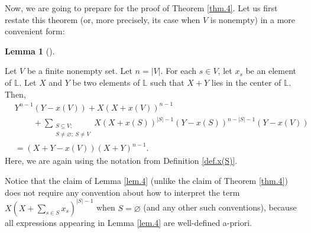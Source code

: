 \documentclass[numbers=enddot,12pt,final,onecolumn,notitlepage]{scrartcl}%
\theoremstyle{definition}
\newtheorem{lem}[theo]{Lemma}
\newenvironment{lemma}[1][]
{\begin{lem}[#1]\begin{leftbar}}
{\end{leftbar}\end{lem}}
\let\sumnonlimits\sum
\renewcommand{\sum}{\sumnonlimits\limits}
\newenvironment{verlong}{}{}
\begin{document}
\begin{verlong}
Now, we are going to prepare for the proof of Theorem \ref{thm.4}. Let us
first restate this theorem (or, more precisely, its case when $V$ is nonempty)
in a more convenient form:

\begin{lemma}
\label{lem.4}Let $V$ be a finite nonempty set. Let $n=\left\vert V\right\vert
$. For each $s\in V$, let $x_{s}$ be an element of $\mathbb{L}$. Let $X$ and
$Y$ be two elements of $\mathbb{L}$ such that $X+Y$ lies in the center of
$\mathbb{L}$. Then,%
\begin{align*}
&  Y^{n-1}\left(  Y-x\left(  V\right)  \right)  +X\left(  X+x\left(  V\right)
\right)  ^{n-1}\\
&  \ \ \ \ \ \ \ \ \ \ +\sum_{\substack{S\subseteq V;\\S\neq\varnothing
;\ S\neq V}}X\left(  X+x\left(  S\right)  \right)  ^{\left\vert S\right\vert
-1}\left(  Y-x\left(  S\right)  \right)  ^{n-\left\vert S\right\vert
-1}\left(  Y-x\left(  V\right)  \right) \\
&  =\left(  X+Y-x\left(  V\right)  \right)  \left(  X+Y\right)  ^{n-1}.
\end{align*}
Here, we are again using the notation from Definition \ref{def.x(S)}.
\end{lemma}

Notice that the claim of Lemma \ref{lem.4} (unlike the claim of Theorem
\ref{thm.4}) does not require any convention about how to interpret the term
$X\left(  X+\sum_{s\in S}x_{s}\right)  ^{\left\vert S\right\vert -1}$ when
$S=\varnothing$ (and any other such conventions), because all expressions
appearing in Lemma \ref{lem.4} are well-defined a-priori.


\end{verlong}
\end{document}
